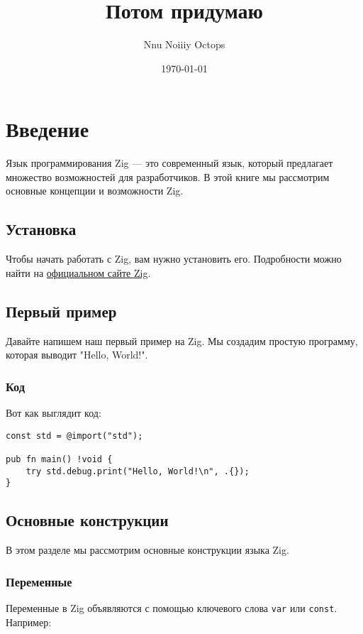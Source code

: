 \documentclass[a4paper, twoside, openany]{book}
\title{Потом придумаю}
\author{Nnu Noiiiy Octops}
\date{\today}
\begin{document}
\maketitle

\tableofcontents

\chapter{Введение}
 \fontsize{14pt}{14pt}\selectfont
Язык программирования Zig — это современный язык, который предлагает множество возможностей для разработчиков. В этой книге мы рассмотрим основные концепции и возможности Zig.

\section{Установка}
 \fontsize{14pt}{14pt}\selectfont
Чтобы начать работать с Zig, вам нужно установить его. Подробности можно найти на \href{https://ziglang.org/download/}{официальном сайте Zig}.

\section{Первый пример}
 \fontsize{14pt}{14pt}\selectfont
Давайте напишем наш первый пример на Zig. Мы создадим простую программу, которая выводит "Hello, World!".

\subsection{Код}
 \fontsize{14pt}{14pt}\selectfont
Вот как выглядит код:

\begin{lstlisting}
const std = @import("std");

pub fn main() !void {
    try std.debug.print("Hello, World!\n", .{});
}
\end{lstlisting}

\section{Основные конструкции}
 \fontsize{14pt}{14pt}\selectfont
В этом разделе мы рассмотрим основные конструкции языка Zig.

\subsection{Переменные}
 \fontsize{14pt}{14pt}\selectfont
Переменные в Zig объявляются с помощью ключевого слова \texttt{var} или \texttt{const}. Например:
\end{document}
